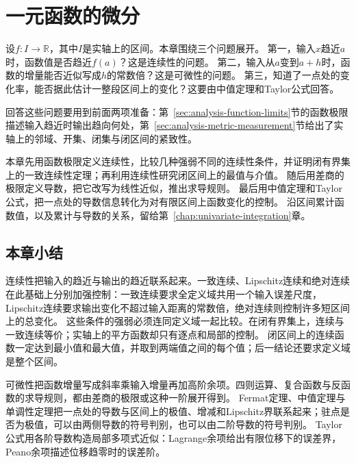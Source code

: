 \chapter{一元函数的微分}
\label{chap:univariate-differentiation}
\label{chap:continuous-functions}

设$f:I\to\mathbb R$，其中$I$是实轴上的区间。本章围绕三个问题展开。
第一，输入$x$趋近$a$时，函数值是否趋近$f(a)$？这是连续性的问题。
第二，输入从$a$变到$a+h$时，函数的增量能否近似写成$h$的常数倍？这是可微性的问题。
第三，知道了一点处的变化率，能否据此估计一整段区间上的变化？这要由中值定理和Taylor公式回答。

回答这些问题要用到前面两项准备：第~\ref{sec:analysis-function-limits}节的函数极限描述输入趋近时输出趋向何处，第~\ref{sec:analysis-metric-measurement}节给出了实轴上的邻域、开集、闭集与闭区间的紧致性。

本章先用函数极限定义连续性，比较几种强弱不同的连续性条件，并证明闭有界集上的一致连续性定理；再利用连续性研究闭区间上的最值与介值。
随后用差商的极限定义导数，把它改写为线性近似，推出求导规则。
最后用中值定理和Taylor公式，把一点处的导数信息转化为对有限区间上函数变化的控制。
沿区间累计函数值，以及累计与导数的关系，留给第~\ref{chap:univariate-integration}章。



\FloatBarrier
\section{本章小结}
\label{sec:analysis-summary}

连续性把输入的趋近与输出的趋近联系起来。一致连续、Lipschitz连续和绝对连续在此基础上分别加强控制：一致连续要求全定义域共用一个输入误差尺度，Lipschitz连续要求输出变化不超过输入距离的常数倍，绝对连续则控制许多短区间上的总变化。
这些条件的强弱必须连同定义域一起比较。在闭有界集上，连续与一致连续等价；实轴上的平方函数却只有逐点和局部的控制。
闭区间上的连续函数一定达到最小值和最大值，并取到两端值之间的每个值；后一结论还要求定义域是整个区间。

可微性把函数增量写成斜率乘输入增量再加高阶余项。四则运算、复合函数与反函数的求导规则，都由差商的极限或这种一阶展开得到。
Fermat定理、中值定理与单调性定理把一点处的导数与区间上的极值、增减和Lipschitz界联系起来；驻点是否为极值，可以由两侧导数的符号判别，也可以由二阶导数的符号判别。
Taylor公式用各阶导数构造局部多项式近似：Lagrange余项给出有限位移下的误差界，Peano余项描述位移趋零时的误差阶。

